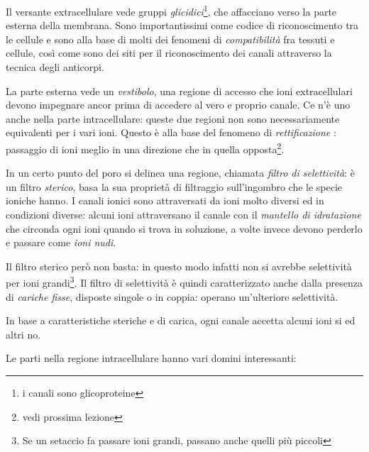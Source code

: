 \documentclass[a4paper,12pt]{article}
\begin{document}
Il versante extracellulare vede gruppi \emph{glicidici}\footnote{i canali sono glicoproteine}, che affacciano verso la parte esterna della membrana. Sono importantissimi come codice di riconoscimento tra le cellule e sono alla base di molti dei fenomeni di \emph{compatibilità} fra tessuti e cellule, così come sono dei siti per il riconoscimento dei canali attraverso la tecnica degli anticorpi.

La parte esterna vede un \emph{vestibolo}, una regione di accesso che ioni extracellulari devono impegnare ancor prima di accedere al vero e proprio canale. Ce n'è uno anche nella parte intracellulare: queste due regioni non sono necessariamente equivalenti per i vari ioni. Questo è alla base del fenomeno di \emph{rettificazione} : passaggio di ioni meglio in una direzione che in quella opposta\footnote{vedi prossima lezione}. 

In un certo punto del poro si delinea una regione, chiamata \emph{filtro di selettività}: è un filtro \emph{sterico}, basa la sua proprietà di filtraggio sull'ingombro che le specie ioniche hanno. I canali ionici sono attraversati da ioni molto diversi ed in condizioni diverse: alcuni ioni attraversano il canale con il \emph{mantello di idratazione} che circonda ogni ioni quando si trova in soluzione, a volte invece devono perderlo e passare come \emph{ioni nudi}.

Il filtro sterico però non basta: in questo modo infatti non si avrebbe selettività per ioni grandi\footnote{Se un setaccio fa passare ioni grandi, passano anche quelli più piccoli}. Il filtro di selettività è quindi caratterizzato anche dalla presenza di \emph{cariche fisse}, disposte singole o in coppia: operano un'ulteriore selettività. 

In base a caratteristiche steriche e di carica, ogni canale accetta alcuni ioni si ed altri no.

Le parti nella regione intracellulare hanno vari domini interessanti:
\end{document}
